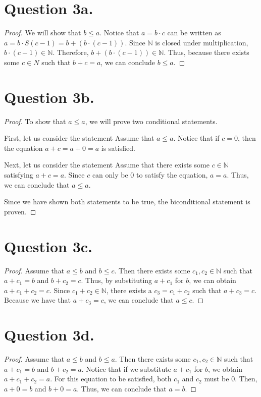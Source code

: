\documentclass{article}
\begin{document}
\section*{Question 3a.}
\begin{proof}
    We will show that $ b \leq a $. Notice that $ a = b \cdot c $ can be written as $ a = b \cdot S(c - 1) = b + (b \cdot (c - 1)) $. Since $ \mathbb{N} $ is closed under multiplication, $ b \cdot (c - 1) \in \mathbb{N} $. Therefore, $ b + (b \cdot (c - 1)) \in \mathbb{N} $. Thus, because there exists some $ c \in N $ such that $ b + c = a $, we can conclude $ b \leq a $.
\end{proof}

\section*{Question 3b.}
\begin{proof}
    To show that $ a \leq a $, we will prove two conditional statements.

    \noindent First, let us consider the statement  Assume that $ a \leq a $. Notice that if $ c = 0 $, then the equation $ a + c = a + 0 = a $ is satisfied.

    \noindent Next, let us consider the statement  Assume that there exists some $ c \in \mathbb{N} $ satisfying $ a + c = a $. Since $ c $ can only be $ 0 $ to satisfy the equation, $ a = a $. Thus, we can conclude that $ a \leq a $.

    \noindent Since we have shown both statements to be true, the biconditional statement is proven.
\end{proof}

\section*{Question 3c.}
\begin{proof}
    Assume that $ a \leq b $ and $ b \leq c $. Then there exists some $ c_1, c_2 \in \mathbb{N} $ such that $ a + c_1 = b $ and $ b + c_2 = c $. Thus, by substituting $ a + c_1 $ for $ b $, we can obtain $ a + c_1 + c_2 = c $. Since $ c_1 + c_2 \in \mathbb{N} $, there exists a $ c_3 = c_1 + c_2 $ such that $ a + c_3 = c $.
    Because we have that $ a + c_3 = c $, we can conclude that $ a \leq c $.
\end{proof}

\section*{Question 3d.}
\begin{proof}
    Assume that $ a \leq b $ and $ b \leq a $. Then there exists some $ c_1, c_2 \in \mathbb{N} $ such that $ a + c_1 = b $ and $ b + c_2 = a $. Notice that if we substitute $ a + c_1 $ for $ b $, we obtain $ a + c_1 + c_2 = a $. For this equation to be satisfied, both $ c_1 $ and $ c_2 $ must be $ 0 $. Then, $ a + 0 = b $ and $ b + 0 = a $. Thus, we can conclude that $ a = b $.
\end{proof}
\end{document}
